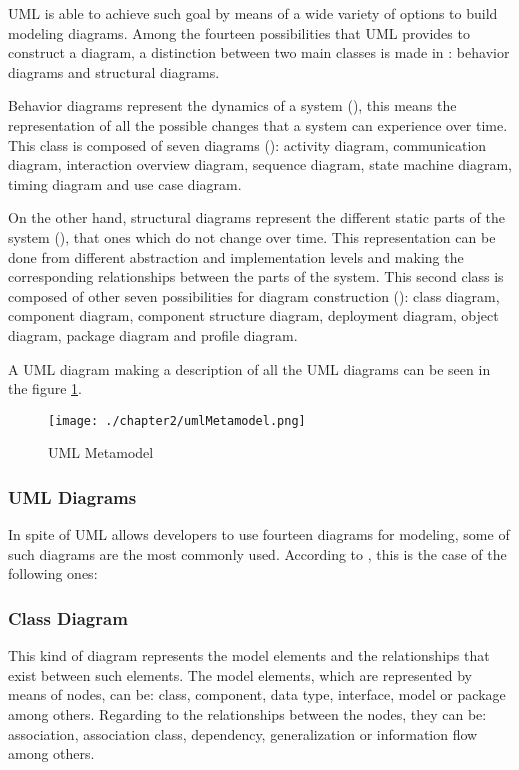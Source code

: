 UML is able to achieve such goal by means of a wide variety of options to build modeling diagrams. Among the fourteen possibilities that UML provides to construct a diagram, a distinction between two main classes is made in \cite{umlwebsite}: behavior diagrams and structural diagrams.

Behavior diagrams represent the dynamics of a system (\cite{umlwebsite}), this means the representation of all the possible changes that a system can experience over time. This class is composed of seven diagrams (\cite{umlwebsite}): activity diagram, communication diagram, interaction overview diagram, sequence diagram, state machine diagram, timing diagram and use case diagram.

On the other hand, structural diagrams represent the different static parts of the system (\cite{umlwebsite}), that ones which do not change over time. This representation can be done from different abstraction and implementation levels and making the corresponding relationships between the parts of the system. This second class is composed of other seven possibilities for diagram construction (\cite{umlwebsite}): class diagram, component diagram, component structure diagram, deployment diagram, object diagram, package diagram and profile diagram.

A UML diagram making a description of all the UML diagrams can be seen in the figure \ref{fig:UML Metamodel}.

\begin{figure}
\centering
{\texttt{[image: ./chapter2/umlMetamodel.png]}}
\caption{UML Metamodel}
\label{fig:UML Metamodel}
\end{figure}

\subsubsection{UML Diagrams}

In spite of UML allows developers to use fourteen diagrams for modeling, some of such diagrams are the most commonly used. According to \cite{umlwebsite}, this is the case of the following ones:

\subsubsection*{Class Diagram}

This kind of diagram represents the model elements and the relationships that exist between such elements. The model elements, which are represented by means of nodes, can be: class, component, data type, interface, model or package among others. Regarding to the relationships between the nodes, they can be: association, association class, dependency, generalization or information flow among others.

